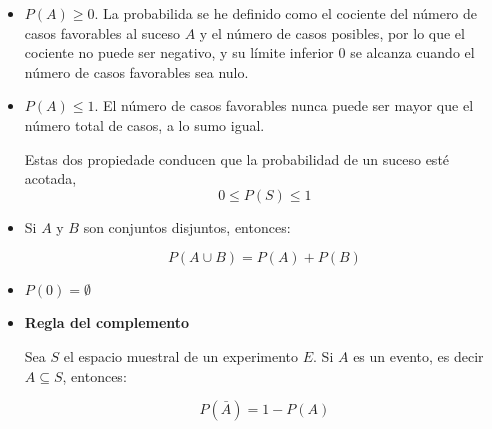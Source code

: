 \begin{tcolorbox}[colback=blue!5!white,colframe=blue!60!black,title=Axiomas de la probabilidad]

\begin{itemize}
\item $P(A) \geq 0$. La probabilida se he definido como el cociente del número
de casos favorables al suceso $A$ y el número de casos posibles, por lo que el
cociente no puede ser negativo, y su límite inferior 0 se alcanza cuando el
número de casos favorables sea nulo.

\item $P(A) \leq 1$. El número de casos favorables nunca puede ser mayor que el
número total de casos, a lo sumo igual.


Estas dos propiedade conducen  que la probabilidad de un suceso esté acotada, 
\begin{equation}
    0 \leq P(S) \leq 1
    \label{eq:acotadaProb}
\end{equation}

\item Si $A$ y $B$ son conjuntos disjuntos, entonces:

\begin{equation}
    P(A \cup B) = P(A) + P(B)
    \label{eq:probaAunionB}
\end{equation}

\item $P(0)=\emptyset$

\item \textbf{Regla del complemento}

Sea $S$ el espacio muestral de un experimento $E$. Si $A$ es un evento, es decir
$A \subseteq S$, entonces:

\begin{equation}
    P(\bar{A}) = 1 - P(A)
    \label{eq:complementRule}
\end{equation}

\end{itemize}
\end{tcolorbox}
